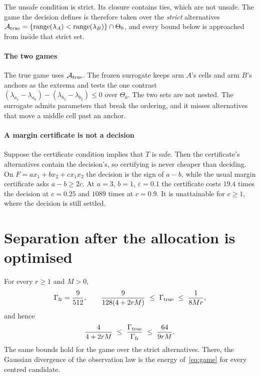 
The unsafe condition is strict. Its closure contains ties, which are not unsafe. The game the
decision defines is therefore taken over the \emph{strict} alternatives
$\mathcal A_{\rm true}=\{\mathrm{range}(\lambda_{A})<\mathrm{range}(\lambda_{B})\}\cap\Theta_{0}$,
and every bound below is approached from inside that strict set.

\paragraph{The two games} The true game uses $\mathcal A_{\rm true}$. The frozen surrogate
keeps arm $A$'s cells and arm $B$'s anchors as the extrema and tests the one contrast
$(\lambda_{a_{1}}-\lambda_{a_{0}})-(\lambda_{b_{3}}-\lambda_{b_{2}})\le0$ over $\Theta_{0}$. The
two sets are not nested. The surrogate admits parameters that break the ordering, and it
misses alternatives that move a middle cell past an anchor.

\paragraph{A margin certificate is not a decision} Suppose the certificate condition implies
that $T$ is safe. Then the certificate's alternatives contain the decision's, so certifying is
never cheaper than deciding. On $F=ax_{1}+bx_{2}+cx_{1}x_{2}$ the decision is the sign of $a-b$,
while the usual margin certificate asks $a-b\ge2c$. At $a=3$, $b=1$, $\varepsilon=0.1$ the
certificate costs $19.4$ times the decision at $c=0.25$ and $1089$ times at $c=0.9$. It is
unattainable for $c\ge1$, where the decision is still settled. \NUM{}


\section{Separation after the allocation is optimised}
\label{sec:separation}

\begin{theorem}[Separation]
\label{thm:sep}
For every $r\ge1$ and $M>0$,
\[
\Gamma_{\rm fr}=\frac{9}{512},\qquad
\frac{9}{128(4+2rM)}\ \le\ \Gamma_{\rm true}\ \le\ \frac{1}{8Mr},
\]
and hence
\[
\frac{4}{4+2rM}\ \le\ \frac{\Gamma_{\rm true}}{\Gamma_{\rm fr}}\ \le\ \frac{64}{9rM}.
\]
The same bounds hold for the game over the strict alternatives. There, the Gaussian divergence
of the observation law is the energy of~\eqref{eq:game} for every centred candidate.
\end{theorem}

